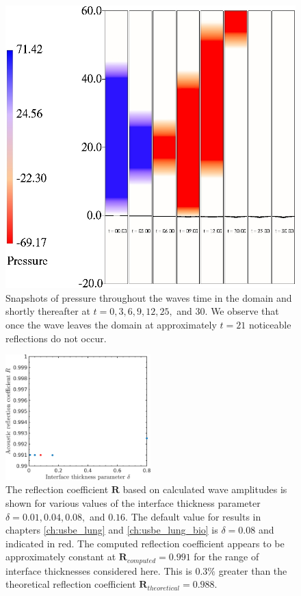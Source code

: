 \begin{figure}
\centering
  \centering
  \includegraphics[width=\textwidth]{./figs/lung_figs/p_snapshots}
  \caption{Snapshots of pressure throughout the waves time in the
    domain and shortly thereafter at $t=0, 3, 6, 9, 12, 25,$ and
    $30$. We observe that once the wave leaves the domain at
    approximately $t=21$ noticeable reflections do not occur.}
\end{figure}

\begin{figure}
\centering
  \centering
  \includegraphics[width=0.5\textwidth]{./figs/lung_figs/delta_R}
  \caption{The reflection coefficient $\boldsymbol{R}$ based on
    calculated wave amplitudes is shown for various values of the
    interface thickness parameter $\delta = 0.01, 0.04, 0.08,$ and
    $0.16$. The default value for results in chapters
    \ref{ch:usbe_lung} and \ref{ch:usbe_lung_bio} is $\delta=0.08$ and
    indicated in red. The computed reflection coefficient appears to
    be approximately constant at $\boldsymbol{R}_{computed}=0.991$ for
    the range of interface thicknesses considered here. This is
    $0.3\%$ greater than the theoretical reflection
    coefficient $\boldsymbol{R}_{theoretical}=0.988$.}
\end{figure}


